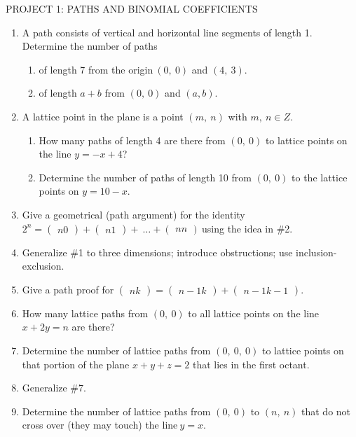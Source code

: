 \documentclass[10pt,letter]{article}
\begin{document}
PROJECT 1: PATHS AND BINOMIAL COEFFICIENTS
\begin{enumerate}
\def\labelenumi{\arabic{enumi}.}

\item
  A path consists of vertical and horizontal line segments of length 1.
  Determine the number of paths
\begin{enumerate}
  \def\labelenumii{\alph{enumii}.}

  \item
    of length 7 from the origin\(\ \left( 0,\ 0 \right)\) and
    \((4,\ 3)\).
  \item
    of length \(a + b\) from \(\left( 0,\ 0 \right)\) and \((a,b)\).

\end{enumerate}
\item
  A lattice point in the plane is a point \((m,\ n)\) with
  \(m,\ n \in Z\).
\begin{enumerate}
  \def\labelenumii{\alph{enumii}.}

  \item
    How many paths of length 4 are there from \((0,\ 0)\) to lattice
    points on the line \(y = - x + 4\)?
  \item
    Determine the number of paths of length 10 from \((0,\ 0)\) to the
    lattice points on \(y = 10 - x\).

\end{enumerate}
\item
  Give a geometrical (path argument) for the identity
  \(2^{n} =
\begin{pmatrix}
  n
  0
  \end{pmatrix}
 +
\begin{pmatrix}
  n
  1
  \end{pmatrix}
 + \ \ldots +
\begin{pmatrix}
  n
  n
  \end{pmatrix}
\ \)using the idea in \#2.
\item
  Generalize \#1 to three dimensions; introduce obstructions; use
  inclusion-exclusion.
\item
  Give a path proof for \(\begin{pmatrix}
  n
  k
  \end{pmatrix}
 =
\begin{pmatrix}
  n - 1
  k
  \end{pmatrix}
 +
\begin{pmatrix}
  n - 1
  k - 1
  \end{pmatrix}
\).
\item
  How many lattice paths from \(\left( 0,\ 0 \right)\) to all lattice
  points on the line \(x + 2y = n\) are there?
\item
  Determine the number of lattice paths from
  \(\left( 0,\ 0,\ 0 \right)\) to lattice points on that portion of the
  plane \(x + y + z = 2\) that lies in the first octant.
\item
  Generalize \#7.
\item
  Determine the number of lattice paths from \(\left( 0,\ 0 \right)\) to
  \((n,\ n)\) that do not cross over (they may touch) the
  line\(\ y = x\).

\end{enumerate}
\end{document}
